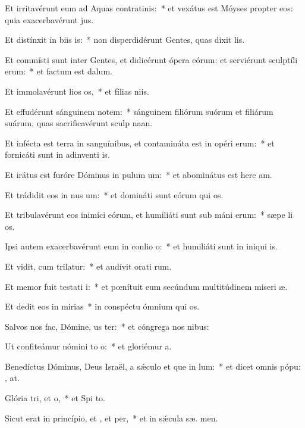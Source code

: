 \item Et irritavérunt eum ad Aquas contratinis:~* et vexátus est Móyses propter eos: quia exacerbavérunt  jus.
\item Et distínxit in biis is:~* non disperdidérunt Gentes, quas dixit  lis.
\item Et commísti sunt inter Gentes, et didicérunt ópera eórum: et serviérunt sculptíli erum:~* et factum est   dalum.
\item Et immolavérunt lios os,~* et fílias  niis.
\item Et effudérunt sánguinem notem:~* sánguinem filiórum suórum et filiárum suárum, quas sacrificavérunt sculp naan.
\item Et infécta est terra in sanguínibus, et contamináta est in opéri erum:~* et fornicáti sunt in adinventi is.
\item Et irátus est furóre Dóminus in pulum um:~* et abominátus est here am.
\item Et trádidit eos in nus um:~* et domináti sunt eórum qui  os.
\item Et tribulavérunt eos inimíci eórum, et humiliáti sunt sub máni erum:~* sæpe li os.
\item Ipsi autem exacerbavérunt eum in conlio o:~* et humiliáti sunt in iniqui is.
\item Et vidit, cum trilatur:~* et audívit orati rum.
\item Et memor fuit testati i:~* et pœnítuit eum secúndum multitúdinem miseri æ.
\item Et dedit eos in mirias~* in conspéctu ómnium qui  os.
\item Salvos nos fac, Dómine, us ter:~* et cóngrega nos  nibus:
\item Ut confiteámur nómini to o:~* et gloriémur   a.
\item Benedíctus Dóminus, Deus Israël, a sǽculo et que in lum:~* et dicet omnis pópu: , at.
\item Glória tri, et o,~* et Spi to.
\item Sicut erat in princípio, et , et per,~* et in sǽcula sæ. men.
